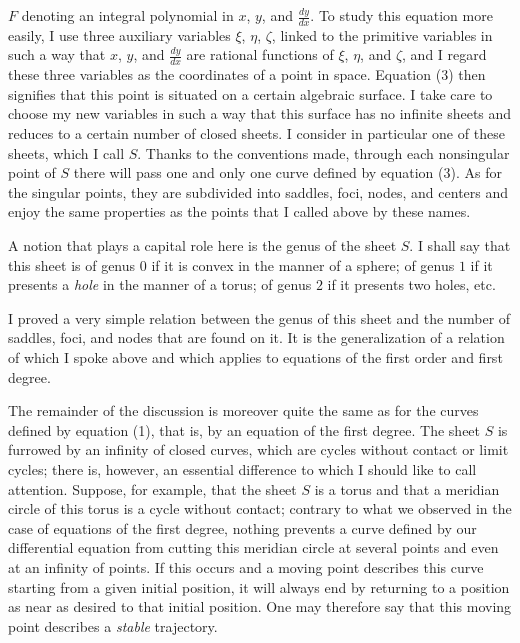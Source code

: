 \documentclass[11pt]{article}
\begin{document}
$F$ denoting an integral polynomial in $x$, $y$, and $\frac{dy}{dx}$. To study this equation more easily, I use three auxiliary variables $\xi$, $\eta$, $\zeta$, linked to the primitive variables in such a way that $x$, $y$, and $\frac{dy}{dx}$ are rational functions of $\xi$, $\eta$, and $\zeta$, and I regard these three variables as the coordinates of a point in space. Equation (3) then signifies that this point is situated on a certain algebraic surface. I take care to choose my new variables in such a way that this surface has no infinite sheets and reduces to a certain number of closed sheets. I consider in particular one of these sheets, which I call $S$. Thanks to the conventions made, through each nonsingular point of $S$ there will pass one and only one curve defined by equation (3). As for the singular points, they are subdivided into saddles, foci, nodes, and centers and enjoy the same properties as the points that I called above by these names.

A notion that plays a capital role here is the genus of the sheet $S$. I shall say that this sheet is of genus $0$ if it is convex in the manner of a sphere; of genus $1$ if it presents a \emph{hole} in the manner of a torus; of genus $2$ if it presents two holes, etc.

I proved a very simple relation between the genus of this sheet and the number of saddles, foci, and nodes that are found on it. It is the generalization of a relation of which I spoke above and which applies to equations of the first order and first degree.

The remainder of the discussion is moreover quite the same as for the curves defined by equation (1), that is, by an equation of the first degree. The sheet $S$ is furrowed by an infinity of closed curves, which are cycles without contact or limit cycles; there is, however, an essential difference to which I should like to call attention. Suppose, for example, that the sheet $S$ is a torus and that a meridian circle of this torus is a cycle without contact; contrary to what we observed in the case of equations of the first degree, nothing prevents a curve defined by our differential equation from cutting this meridian circle at several points and even at an infinity of points. If this occurs and a moving point describes this curve starting from a given initial position, it will always end by returning to a position as near as desired to that initial position. One may therefore say that this moving point describes a \emph{stable} trajectory.
\end{document}
